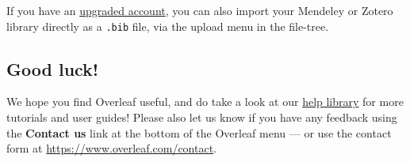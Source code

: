 \documentclass{article}
\begin{document}
If you have an \href{https://www.overleaf.com/user/subscription/plans}{upgraded account}, you can also import your Mendeley or Zotero library directly as a \verb|.bib| file, via the upload menu in the file-tree.

\subsection{Good luck!}

We hope you find Overleaf useful, and do take a look at our \href{https://www.overleaf.com/learn}{help library} for more tutorials and user guides! Please also let us know if you have any feedback using the \textbf{Contact us} link at the bottom of the Overleaf menu --- or use the contact form at \url{https://www.overleaf.com/contact}.



\end{document}
